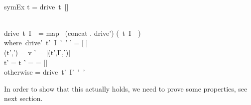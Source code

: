\begin{function}
  \signature{symEx :: \Task \rightarrow [(\Task,[\mathrm{Inputs}],)]} \\

  symEx t = drive\ t\ []\ \emptyset\ \True\\
\end{function}


\begin{function}
  \signature{drive :: \Task {} \times {} \times {} \rightarrow [(\Task,[\mathrm{Inputs}],)]} \\
  drive\ t\ I\ \sigma \ \phi  = map \ (concat . drive') (\Rrightarrow\ t\ I\ \sigma \ \phi)\\
                                  where\ drive'\ t'\ I\ \sigma'\ \phi' \mid \neg {} \phi' = [ ]\\
                                                                       \mid \Value(t',\sigma') = v \wedge {} \phi' = [(t',I',\phi')]\\
                                                                       \mid t' = t \wedge \phi' = \phi = []\\
                                                                       \mid otherwise = drive\ t'\ I'\ \sigma'\
                                                                        \phi'
\end{function}

In order to show that this actually holds, we need to prove some properties, see next section.
